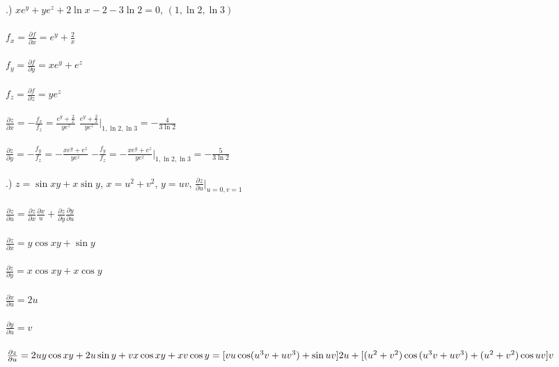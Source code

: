 \documentclass[12pt]{article}
\begin{document}
.) $xe^{y} + ye^{z} + 2\ln{x}-2 -3\ln{2} = 0$, \hspace{10pt} $(1, \ln{2}, \ln{3})$\\\\
\noindent $f_{x} = \frac{\partial f}{\partial x} = e^{y}+\frac{2}{x}$\\\\
\noindent $f_{y} = \frac{\partial f}{\partial y} = xe^{y}+e^{z}$\\\\
\noindent $f_{z} = \frac{\partial f}{\partial z} = ye^{z}$\\\\
\noindent $\frac{\partial z}{\partial x} = -\frac{f_{x}}{f_{z}} = \frac{e^{y}+\frac{2}{x}}{ye^{z}}$
\noindent $\frac{e^{y}+\frac{2}{x}}{ye^{z}}\Big|_{1, \ln{2}, \ln{3}} = -\frac{4}{3\ln{2}}$\\\\
\noindent $\frac{\partial z}{\partial y} = -\frac{f_{y}}{f_{z}} = -\frac{xe^{y}+e^{z}}{ye^{z}}$
\noindent $-\frac{f_{y}}{f_{z}} = -\frac{xe^{y}+e^{z}}{ye^{z}}\Big|_{1, \ln{2}, \ln{3}} = -\frac{5}{3\ln{2}}$\\\\

.)  \hspace{10pt}$z = \sin{xy} + x\sin{y}$, \hspace{10pt} $x = u^{2} + v^{2}$, \hspace{10pt} $y = uv$, \hspace{10pt} $\frac{\partial z}{\partial u} \Big|_{u = 0, v=1}$\\\\
\noindent $\frac{\partial z}{\partial u} = \frac{\partial z}{\partial x}\frac{\partial x}{u} + \frac{\partial z}{\partial y}\frac{\partial y}{\partial u}$\\\\
\noindent $\frac{\partial z}{\partial x} = y\cos{xy} + \sin{y}$\\\\
\noindent $\frac{\partial z}{\partial y} = x\cos{xy} + x\cos{y}$\\\\
\noindent $\frac{\partial x}{\partial u} = 2u$\\\\
\noindent $\frac{\partial y}{\partial u} = v$\\\\

\noindent $\frac{\partial z}{\partial u} = 2uy\cos{xy} + 2u\sin{y} + vx\cos{xy} + xv\cos{y}
\\\\= [vu\cos(u^{3}v + uv^{3}) + \sin{uv}]2u + [(u^{2}+v^{2})\cos{(u^{3}v + uv^{3}) + (u^{2} + v^{2})\cos{uv}}]v$\\\\
\end{document}
